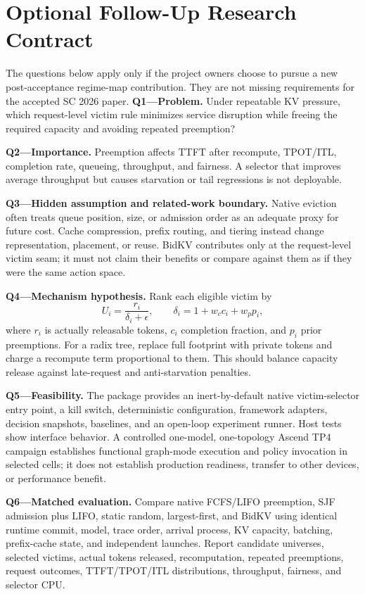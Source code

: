 \documentclass[10pt,twocolumn]{article}
\begin{document}
\section{Optional Follow-Up Research Contract}
The questions below apply only if the project owners choose to pursue a new
post-acceptance regime-map contribution. They are not missing requirements for
the accepted SC 2026 paper.
\textbf{Q1---Problem.} Under repeatable KV pressure, which request-level victim rule minimizes service disruption while freeing the required capacity and avoiding repeated preemption?

\textbf{Q2---Importance.} Preemption affects TTFT after recompute, TPOT/ITL, completion rate, queueing, throughput, and fairness. A selector that improves average throughput but causes starvation or tail regressions is not deployable.

\textbf{Q3---Hidden assumption and related-work boundary.} Native eviction often treats queue position, size, or admission order as an adequate proxy for future cost. Cache compression, prefix routing, and tiering instead change representation, placement, or reuse. BidKV contributes only at the request-level victim seam; it must not claim their benefits or compare against them as if they were the same action space.

\textbf{Q4---Mechanism hypothesis.} Rank each eligible victim by
\[
U_i=\frac{r_i}{\delta_i+\epsilon},\qquad
\delta_i=1+w_c c_i+w_p p_i,
\]
where $r_i$ is actually releasable tokens, $c_i$ completion fraction, and $p_i$ prior preemptions. For a radix tree, replace full footprint with private tokens and charge a recompute term proportional to them. This should balance capacity release against late-request and anti-starvation penalties.

\textbf{Q5---Feasibility.} The package provides an inert-by-default native victim-selector entry point, a kill switch, deterministic configuration, framework adapters, decision snapshots, baselines, and an open-loop experiment runner. Host tests show interface behavior. A controlled one-model, one-topology Ascend TP4 campaign establishes functional graph-mode execution and policy invocation in selected cells; it does not establish production readiness, transfer to other devices, or performance benefit.

\textbf{Q6---Matched evaluation.} Compare native FCFS/LIFO preemption, SJF admission plus LIFO, static random, largest-first, and BidKV using identical runtime commit, model, trace order, arrival process, KV capacity, batching, prefix-cache state, and independent launches. Report candidate universes, selected victims, actual tokens released, recomputation, repeated preemptions, request outcomes, TTFT/TPOT/ITL distributions, throughput, fairness, and selector CPU.
\end{document}

